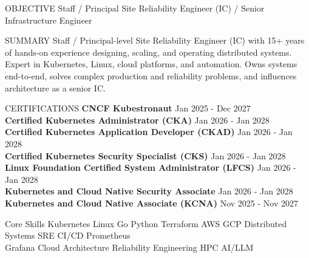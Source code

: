 \documentclass{resume} %
\begin{document}

\begin{rSection}{OBJECTIVE}
{Staff / Principal Site Reliability Engineer (IC) / Senior Infrastructure Engineer}
\end{rSection}

\begin{rSection}{SUMMARY}
{Staff / Principal-level Site Reliability Engineer (IC) with 15+ years of hands-on experience designing, scaling, and operating distributed systems.
Expert in Kubernetes, Linux, cloud platforms, and automation. Owns systems end-to-end, solves complex production and reliability problems, and influences architecture as a senior IC.}
\end{rSection}

\begin{rSection}{CERTIFICATIONS}
\textbf{CNCF Kubestronaut} \hfill Jan 2025 - Dec 2027\\
\textbf{Certified Kubernetes Administrator (CKA)} \hfill Jan 2026 - Jan 2028\\
\textbf{Certified Kubernetes Application Developer (CKAD)} \hfill Jan 2026 - Jan 2028\\
\textbf{Certified Kubernetes Security Specialist (CKS)} \hfill Jan 2026 - Jan 2028\\
\textbf{Linux Foundation Certified System Administrator (LFCS)} \hfill Jan 2026 - Jan 2028\\
\textbf{Kubernetes and Cloud Native Security Associate} \hfill Jan 2026 - Jan 2028\\
\textbf{Kubernetes and Cloud Native Associate (KCNA)} \hfill Nov 2025 - Nov 2027\\
\end{rSection}

\begin{rSection}{Core Skills}
\center
Kubernetes \textbullet{}
Linux \textbullet{}
Go \textbullet{}
Python \textbullet{}
Terraform \textbullet{}
AWS \textbullet{}
GCP \textbullet{}
Distributed Systems \textbullet{}
SRE \textbullet{}
CI/CD \textbullet{}
Prometheus \\
Grafana \textbullet{}
Cloud Architecture \textbullet{}
Reliability Engineering \textbullet{}
HPC \textbullet{}
AI/LLM
\end{rSection}
\end{document}

